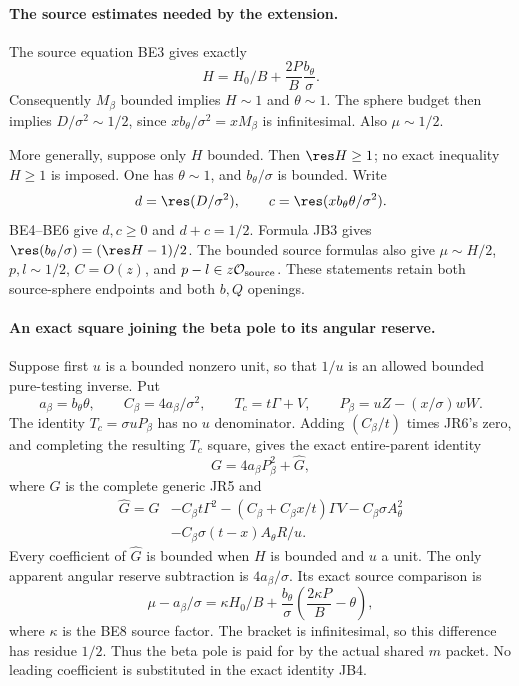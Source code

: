 \paragraph{The source estimates needed by the extension.}
The source equation BE3 gives exactly
\[
 H=H_0/B+\frac{2P}{B}\frac{b_\theta}{\sigma}.
\tag{JB3}
\]
Consequently $M_\beta$ bounded implies $H\sim1$ and $\theta\sim1$.
The sphere budget then implies $D/\sigma^2\sim1/2$, since
$xb_\theta/\sigma^2=xM_\beta$ is infinitesimal. Also $\mu\sim1/2$.

More generally, suppose only $H$ bounded. Then $\res H\ge1$;
no exact inequality $H\ge1$ is imposed. One has $\theta\sim1$,
and $b_\theta/\sigma$ is bounded. Write
\[
 d=\res(D/\sigma^2),\qquad
 c=\res(xb_\theta\theta/\sigma^2).
\]
BE4--BE6 give $d,c\ge0$ and $d+c=1/2$. Formula JB3 gives
$\res(b_\theta/\sigma)=(\res H-1)/2$. The bounded source formulas
also give $\mu\sim H/2$, $p,l\sim1/2$, $C=O(z)$, and
$p-l\in z\mathcal O_{\rm source}$. These statements retain both
source-sphere endpoints and both $b,Q$ openings.

\paragraph{An exact square joining the beta pole to its angular reserve.}
Suppose first $u$ is a bounded nonzero unit, so that $1/u$ is an
allowed bounded pure-testing inverse. Put
\[
 a_\beta=b_\theta\theta,\qquad
 C_\beta=4a_\beta/\sigma^2,\qquad T_c=t\Gamma+V,
 \qquad P_\beta=uZ-(x/\sigma)wW.
\]
The identity $T_c=\sigma uP_\beta$ has no $u$ denominator.
Adding $(C_\beta/t)$ times JR6's zero, and completing the resulting
$T_c$ square, gives the exact entire-parent identity
\[
 G=4a_\beta P_\beta^2+\widehat G,
\tag{JB4}
\]
where $G$ is the complete generic JR5 and
\begin{align*}
 \widehat G=G
 &-C_\beta t\Gamma^2
 -(C_\beta+C_\beta x/t)\Gamma V
 -C_\beta\sigma A_\theta^2\\
 &-C_\beta\sigma(t-x)A_\theta R/u.
\tag{JB5}
\end{align*}
Every coefficient of $\widehat G$ is bounded when $H$ is bounded
and $u$ a unit. The only apparent angular reserve subtraction is
$4a_\beta/\sigma$. Its exact source comparison is
\[
 \mu-a_\beta/\sigma
 =\kappa H_0/B+
    \frac{b_\theta}{\sigma}\left(\frac{2\kappa P}{B}-\theta\right),
\tag{JB6}
\]
where $\kappa$ is the BE8 source factor. The bracket is infinitesimal,
so this difference has residue $1/2$. Thus the beta pole is paid for
by the actual shared $m$ packet. No leading coefficient is substituted
in the exact identity JB4.


